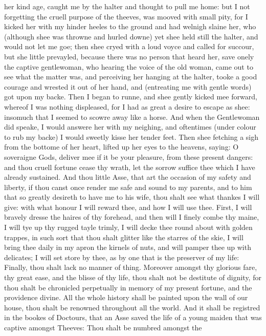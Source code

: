 her kind age, caught me by the halter and thought to pull me home: but I not
forgetting the cruell purpose of the theeves, was mooved with small pity, for I
kicked her with my hinder heeles to the ground and had welnigh slaine her, who
(although shee was throwne and hurled downe) yet shee held still the halter,
and would not let me goe; then shee cryed with a loud voyce and called for
succour, but she little prevayled, because there was no person that heard her,
save onely the captive gentlewoman, who hearing the voice of the old woman,
came out to see what the matter was, and perceiving her hanging at the halter,
tooke a good courage and wrested it out of her hand, and (entreating me with
gentle words) got upon my backe. Then I began to runne, and shee gently kicked
mee forward, whereof I was nothing displeased, for I had as great a desire to
escape as shee: insomuch that I seemed to scowre away like a horse. And when
the Gentlewoman did speake, I would answere her with my neighing, and
oftentimes (under colour to rub my backe) I would sweetly kisse her tender
feet. Then shee fetching a sigh from the bottome of her heart, lifted up her
eyes to the heavens, saying: O soveraigne Gods, deliver mee if it be your
pleasure, from these present dangers: and thou cruell fortune cease thy wrath,
let the sorrow suffice thee which I have already sustained. And thou little
Asse, that art the occasion of my safety and liberty, if thou canst once render
me safe and sound to my parents, and to him that so greatly desireth to have me
to his wife, thou shalt see what thankes I will give: with what honour I will
reward thee, and how I will use thee. First, I will bravely dresse the haires
of thy forehead, and then will I finely combe thy maine, I will tye up thy
rugged tayle trimly, I will decke thee round about with golden trappes, in such
sort that thou shalt glitter like the starres of the skie, I will bring thee
daily in my apron the kirnels of nuts, and will pamper thee up with delicates;
I will set store by thee, as by one that is the preserver of my life: Finally,
thou shalt lack no manner of thing. Moreover amongst thy glorious fare, thy
great ease, and the blisse of thy life, thou shalt not be destitute of dignity,
for thou shalt be chronicled perpetually in memory of my present fortune, and
the providence divine. All the whole history shall be painted upon the wall of
our house, thou shalt be renowned throughout all the world. And it shall be
registred in the bookes of Doctours, that an Asse saved the life of a young
maiden that was captive amongst Theeves: Thou shalt be numbred amongst the
